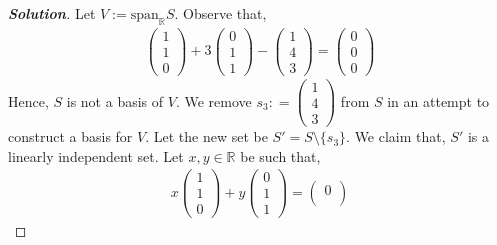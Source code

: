 \documentclass[10pt]{scrartcl}
\theoremstyle{definition}
\newenvironment{solution} {\begin{proof}[\normalfont \textbf{Solution}]} {\end{proof}}
\newcommand{\rn}{\mathbb{R}}
\begin{document}
\begin{solution}
    Let $V:= \text{span}_\rn S$. Observe that,
        \begin{gather*}
            \begin{pmatrix}
                1 \\
                1 \\
                0 
            \end{pmatrix}
            +3
            \begin{pmatrix}
                0 \\
                1 \\
                1 
            \end{pmatrix}
            -
            \begin{pmatrix}
                1 \\
                4 \\
                3 
            \end{pmatrix}
            =
            \begin{pmatrix}
                0 \\
                0 \\
                0 
            \end{pmatrix}
        \end{gather*}
    Hence, $S$ is not a basis of $V$. We remove 
    $s_3 : = 
    \begin{pmatrix}
        1 \\
        4 \\
        3
    \end{pmatrix}
    $ from $S$ in an attempt to construct a basis for $V$. Let the new set be $S' = S \setminus \{s_3\}$.
    We claim that, $S'$ is a linearly independent set. Let $x, y \in \rn$ be such that,
        \begin{gather*}
            x
            \begin{pmatrix}
                1 \\
                1 \\
                0 
            \end{pmatrix}
            +y
            \begin{pmatrix}
                0 \\
                1 \\
                1 
            \end{pmatrix}
            =
            \begin{pmatrix}
                0 \\

\end{pmatrix}
\end{gather*}
\end{solution}
\end{document}
